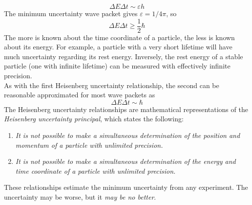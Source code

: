 \documentclass{subfiles}
\begin{document}
			\[\Delta E \Delta t \sim \varepsilon h\]
			The minimum uncertainty wave packet gives \(\varepsilon = 1/4\pi\), so
			\[\Delta E \Delta t \ge \frac{1}{2}\hbar \tag{Heisenberg energy-time uncertainty relationship}\]
			The more is known about the time coordinate of a particle, the less is known about its energy. For example, a particle with a very short lifetime will have much uncertainty regarding its rest energy. Inversely, the rest energy of a stable particle (one with infinite lifetime) can be measured with effectively infinite precision. \\
			As with the first Heisenberg uncertainty relationship, the second can be reasonable approximated for most wave packets as
			\[\Delta E \Delta t \sim \hbar\]
		The Heisenberg uncertainty relationships are mathematical representations of the \textit{Heisenberg uncertainty principal}, which states the following:
			\begin{enumerate}
				\item 
					\textit{It is not possible to make a simultaneous determination of the position and momentum of a particle with unlimited precision.}
				\item
					\textit{It is not possible to make a simultaneous determination of the energy and time coordinate of a particle with unlimited precision.}
			\end{enumerate}
			These relationships estimate the minimum uncertainty from any experiment. The uncertainty may be worse, but it \textit{may be no better}.
\end{document}
